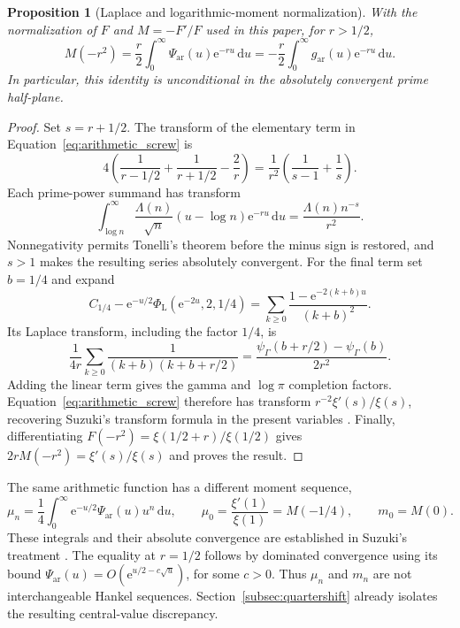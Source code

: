 \documentclass[11pt,letterpaper]{article}
\numberwithin{equation}{section}
\newtheorem{proposition}[theorem]{Proposition}
\theoremstyle{definition}
\theoremstyle{remark}
\newcommand{\dd}{\,\mathrm d}
\newcommand{\e}{\mathrm e}
\begin{document}
\begin{proposition}[Laplace and logarithmic-moment normalization]
\label{prop:screw_laplace}
With the normalization of $F$ and $M=-F'/F$ used in this paper, for $r>1/2$,
\begin{equation}
 M(-r^2)=\frac r2\int_0^\infty\Psi_{\mathrm{ar}}(u)\e^{-ru}\dd u
 =-\frac r2\int_0^\infty g_{\mathrm{ar}}(u)\e^{-ru}\dd u.
 \label{eq:screw_moment_laplace}
\end{equation}
In particular, this identity is unconditional in the absolutely convergent prime half-plane.
\end{proposition}
\begin{proof}
Set $s=r+1/2$. The transform of the elementary term in Equation~\eqref{eq:arithmetic_screw} is
\[
 4\left(\frac1{r-1/2}+\frac1{r+1/2}-\frac2r\right)
 =\frac1{r^2}\left(\frac1{s-1}+\frac1s\right).
\]
Each prime-power summand has transform
\[
 \int_{\log n}^\infty\frac{\Lambda(n)}{\sqrt n}
 (u-\log n)\e^{-ru}\dd u=\frac{\Lambda(n)n^{-s}}{r^2}.
\]
Nonnegativity permits Tonelli's theorem before the minus sign is restored, and $s>1$ makes the resulting series absolutely convergent. For the final term set $b=1/4$ and expand
\[
 C_{1/4}-\e^{-u/2}\Phi_{\mathrm L}(\e^{-2u},2,1/4)
 =\sum_{k\geq0}\frac{1-\e^{-2(k+b)u}}{(k+b)^2}.
\]
Its Laplace transform, including the factor $1/4$, is
\[
 \frac1{4r}\sum_{k\geq0}\frac1{(k+b)(k+b+r/2)}
 =\frac{\psi_\Gamma(b+r/2)-\psi_\Gamma(b)}{2r^2}.
\]
Adding the linear term gives the gamma and $\log\pi$ completion factors. Equation~\eqref{eq:arithmetic_screw} therefore has transform $r^{-2}\xi'(s)/\xi(s)$, recovering Suzuki's transform formula in the present variables \cite[Theorem~1.1]{suzuki2023}. Finally, differentiating $F(-r^2)=\xi(1/2+r)/\xi(1/2)$ gives $2rM(-r^2)=\xi'(s)/\xi(s)$ and proves the result.
\end{proof}

The same arithmetic function has a different moment sequence,
\begin{equation}
 \mu_n=\frac14\int_0^\infty\e^{-u/2}\Psi_{\mathrm{ar}}(u)u^n\dd u,
 \qquad \mu_0=\frac{\xi'(1)}{\xi(1)}=M(-1/4),\qquad m_0=M(0).
 \label{eq:screw_quarter_shift}
\end{equation}
These integrals and their absolute convergence are established in Suzuki's treatment \cite[Theorem~1.1 and Equation~(1.13)]{suzuki2023}. The equality at $r=1/2$ follows by dominated convergence using its bound $\Psi_{\mathrm{ar}}(u)=O(\e^{u/2-c\sqrt u})$, for some $c>0$. Thus $\mu_n$ and $m_n$ are not interchangeable Hankel sequences. Section~\ref{subsec:quartershift} already isolates the resulting central-value discrepancy.
\end{document}
